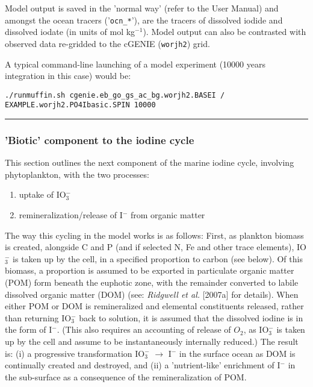 Model output is saved in the 'normal way' (refer to the User Manual) and amongst the ocean tracers ('\texttt{ocn\_*}'), are the tracers of dissolved iodide and dissolved iodate (in units of mol kg\(^{-1}\)). Model output can also be contrasted with observed data re-gridded to the cGENIE (\texttt{worjh2}) grid.

\noindent A typical command-line launching of a model experiment (10000 years integration in this case) would be:
\vspace{-1mm}\begin{verbatim}./runmuffin.sh cgenie.eb_go_gs_ac_bg.worjh2.BASEI /
EXAMPLE.worjh2.PO4Ibasic.SPIN 10000\end{verbatim}\vspace{-1mm}

%
\noindent\rule{4cm}{0.5pt}
\subsubsection{'Biotic' component to the iodine cycle}
\vspace{1mm}

This section outlines the next component of the marine iodine cycle, involving phytoplankton, with the two processes:
\begin{enumerate}[noitemsep]
\vspace{1mm}
\item uptake of IO\(^{-}_{3}\)
\vspace{1mm}
\item  remineralization/release of I\(^{-}\) from organic matter
\end{enumerate}

\vspace{1mm}
\noindent The way this cycling in the model works is as follows: First, as plankton biomass is created, alongside C and P (and if selected N, Fe and other trace elements), IO\(^{-}_{3}\) is taken up by the cell, in a specified proportion to carbon (see below). Of this biomass, a proportion is assumed to be exported in particulate organic matter (POM) form beneath the euphotic zone, with the remainder converted to labile dissolved organic matter (DOM) (see: \textit{Ridgwell et al.} [2007a] for details). When either POM or DOM is remineralized and elemental constituents released, rather than returning IO\(^{-}_{3}\) back to solution, it is assumed that the dissolved iodine is in the form of I\(^{-}\). (This also requires an accounting of release of \(O_{2}\), as IO\(^{-}_{3}\) is taken up by the cell and assume to be instantaneously internally reduced.) The result is: (i) a progressive transformation IO\(^{-}_{3}\) \(\rightarrow\) I\(^{-}\) in the surface ocean as DOM is continually created and destroyed, and (ii) a 'nutrient-like' enrichment of I\(^{-}\) in the sub-surface as a consequence of the remineralization of POM.

